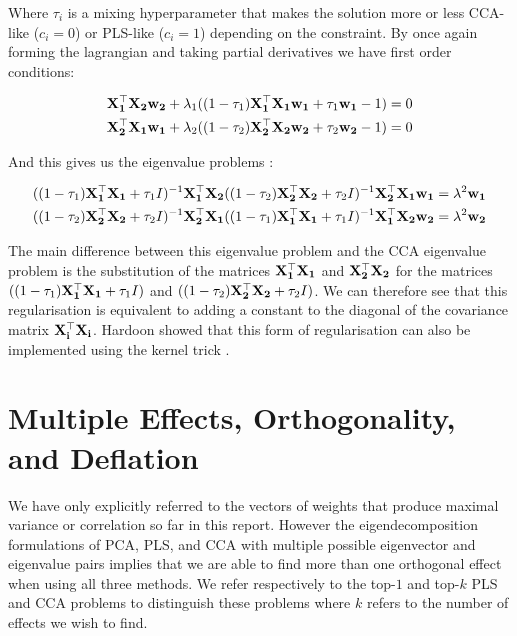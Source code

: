 Where $\tau_i$ is a mixing hyperparameter that makes the solution more or less CCA-like ($c_i=0$) or PLS-like ($c_i=1$) depending on the constraint. By once again forming the lagrangian and taking partial derivatives we have first order conditions:

\begin{align}
     & \bold{X_1^{\top}X_2w_2} + \lambda_1((1-\tau_1)\bold{X_1^{\top}X_1w_1}+\tau_1\bold{w_1}-1)=0 \\
     & \bold{X_2^{\top}X_1w_1} + \lambda_2((1-\tau_2)\bold{X_2^{\top}X_2w_2}+\tau_2\bold{w_2}-1)=0
\end{align}

And this gives us the eigenvalue problems \cite{rosipal2005overview}:

\begin{align}
     & ((1-\tau_1)\bold{X_1^{\top}X_1}+\tau_1I)^{-1}\bold{X_1^{\top}X_2}((1-\tau_2)\bold{X_2^{\top}X_2}+\tau_2I)^{-1}\bold{X_2^{\top}X_1w_1}=\lambda^2\bold{w_1} \notag \\
     & ((1-\tau_2)\bold{X_2^{\top}X_2}+\tau_2I)^{-1}\bold{X_2^{\top}X_1}((1-\tau_1)\bold{X_1^{\top}X_1}+\tau_1I)^{-1}\bold{X_1^{\top}X_2w_2}=\lambda^2\bold{w_2}
\end{align}

The main difference between this eigenvalue problem and the CCA eigenvalue problem is the substitution of the matrices $\bold{X_1^{\top}X_1}$ and $\bold{X_2^{\top}X_2}$ for the matrices $((1-\tau_1)\bold{X_1^{\top}X_1}+\tau_1I)$ and $((1-\tau_2)\bold{X_2^{\top}X_2}+\tau_2I)$. We can therefore see that this regularisation is equivalent to adding a constant to the diagonal of the covariance matrix $\bold{X_i^{\top}X_i}$. Hardoon showed that this form of regularisation can also be implemented using the kernel trick \cite{hardoon2004canonical}.

\section{Multiple Effects, Orthogonality, and Deflation}\label{sec:orthogonality}

We have only explicitly referred to the vectors of weights that produce maximal variance or correlation so far in this report. However the eigendecomposition formulations of PCA, PLS, and CCA with multiple possible eigenvector and eigenvalue pairs implies that we are able to find more than one orthogonal effect when using all three methods. We refer respectively to the top-$1$ and top-$k$ PLS and CCA problems to distinguish these problems where $k$ refers to the number of effects we wish to find.

